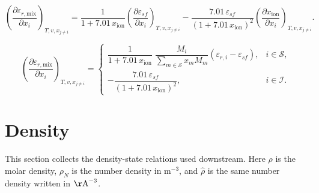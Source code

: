 \documentclass[12pt, letterpaper]{article}
\begin{document}

\begin{equation}
    \left(\frac{\partial \varepsilon_{r,\mathrm{mix}}}{\partial x_{i}}\right)_{T,v,x_{j\neq i}}
    =
    \frac{1}{1+7.01\,x_{\mathrm{ion}}}
    \left(\frac{\partial \varepsilon_{sf}}{\partial x_{i}}\right)_{T,v,x_{j\neq i}}
    -\frac{7.01\,\varepsilon_{sf}}{\left(1+7.01\,x_{\mathrm{ion}}\right)^2}
    \left(\frac{\partial x_{\mathrm{ion}}}{\partial x_{i}}\right)_{T,v,x_{j\neq i}} .
    \label{eq:depsr_mix_dxi}
\end{equation}


\begin{equation}
    \left(\frac{\partial \varepsilon_{r,\mathrm{mix}}}{\partial x_{i}}\right)_{T,v,x_{j\neq i}}
    =
    \begin{cases}
        \dfrac{1}{1+7.01\,x_{\mathrm{ion}}}\;
        \dfrac{M_{i}}{\displaystyle \sum_{m\in\mathcal{S}} x_{m} M_{m}}
        \left(\varepsilon_{r,i}-\varepsilon_{sf}\right),
         & i\in\mathcal{S}, \\[14pt]
        -\dfrac{7.01\,\varepsilon_{sf}}{\left(1+7.01\,x_{\mathrm{ion}}\right)^{2}},
         & i\in\mathcal{I}.
    \end{cases}
    \label{eq:depsr_mix_dxi_piecewise}
\end{equation}

\section{Density}
\label{sec:initial_density_solve}

This section collects the density-state relations used downstream. Here \(\rho\) is the molar density, \(\rho_{N}\) is the number density in \(\mathrm{m}^{-3}\), and \(\hat{\rho}\) is the same number density written in \(\mathrm{\AA}^{-3}\).
\end{document}
